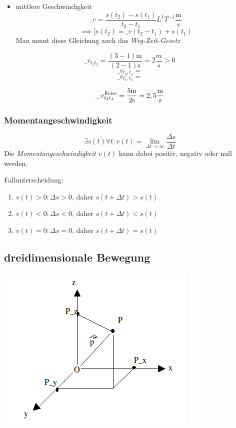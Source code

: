 \documentclass[a4paper,10pt]{scrartcl}
\begin{document}
\begin{itemize}
 \item mittlere Geschwindigkeit
\[
 \_v= \frac{s(t_2)-s(t_1)}{t_2-t_1} L^1 T^{-1} \frac{\text{m}}{\text{s}}
\]
\[
 \implies [s(t_2)=\_v (t_2-t_1)+s(t_1) 
\]
Man nennt diese Gleichung auch das \emph{Weg-Zeit-Gesetz}
\end{itemize}
\begin{note}
\[
 \_v_{t_1t_2}=\frac{(3-1)\text{m}}{(2-1)\text{s}}=2 \frac{m}{s}>0
\]
\[
 \_v_{t_2,t_4}=
\]
\[
 \_v_{t_1,t_5}=
\]

\[ 
 \_v^{\text{Reise}}_{t_2t_4}=\frac{5 \text{m}}{2\text{s}}=2,5 \frac{\text{m}}{\text{s}}
\]

\end{note}

\subsubsection{Momentangeschwindigkeit}
\[
 \exists s(t)\forall t: v(t)=\lim\limits_{\Delta t \rightarrow \infty} \frac{\Delta s}{\Delta t}
\]
Die \emph{Momentangeschwindigkeit} $v(t)$ kann dabei positiv, negativ oder null werden.

Fallunterscheidung:
\begin{enumerate}
 \item $v(t)>0: \Delta s >0$, daher $s(t+\Delta t)>s(t)$
 \item $ v(t)<0: \Delta s<0$, daher $s(t+\Delta t)<s(t)$
 \item $ v(t)=0: \Delta s=0$, daher $s(t+\Delta t)=s(t)$
\end{enumerate}
 

\subsection{dreidimensionale Bewegung}

\includegraphics[scale=0.5]{pic2.png}
\end{document}

